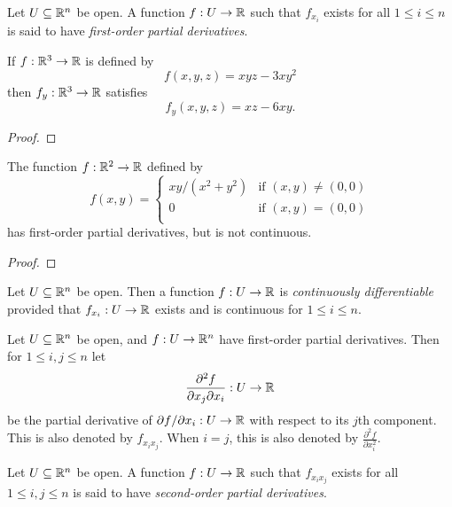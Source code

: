 \documentclass[letterpaper, twoside, 12pt]{book}
\begin{document}
\begin{definition}
  Let \(U\subseteq\mathbb R^n\) be open. A function
  \(f:U\to\mathbb R\) such that \(f_{x_i}\) exists for all \(1\leq i\leq n\) is said
  to have \textit{first-order partial derivatives}.
\end{definition}

\begin{example}[13.8*]
  If \(f:\mathbb R^3\to\mathbb R\) is defined by
  \[
    f(x,y,z)=xyz-3xy^2
  \]
  then \(f_y:\mathbb R^3\to\mathbb R\) satisfies
  \[
    f_y(x,y,z)=xz-6xy
  .\]
\end{example}
\begin{proof}

\end{proof}

\begin{example}[13.9]
  The function \(f:\mathbb R^2\to\mathbb R\) defined by
  \[
    f(x,y) = \begin{cases}
      xy/(x^2+y^2) & \text{if } (x,y)\not=(0,0) \\
      0 & \text{if } (x,y)=(0,0) \\
    \end{cases}
  \]
  has first-order partial derivatives, but is not continuous.
\end{example}
\begin{proof}

\end{proof}

\begin{definition}
  Let \(U\subseteq\mathbb R^n\) be open. Then a function
  \(f:U\to\mathbb R\) is \textit{continuously differentiable} provided that
  \(f_{x_i}:U\to\mathbb R\) exists and is continuous for \(1\leq i\leq n\).
\end{definition}

\begin{definition}
  Let \(U\subseteq\mathbb R^n\) be open, and \(f:U\to\mathbb R^n\) have first-order
  partial derivatives. Then for \(1\leq i,j\leq n\) let
  \[
    \frac{\partial^2 f}{\partial x_j\partial x_i}
      :
    U \to \mathbb R
  \]
  be the partial derivative of \(\partial f/\partial x_i:U\to\mathbb R\)
  with respect to its \(j\)th component. This is also denoted by
  \(f_{x_ix_j}\). When \(i=j\), this is also denoted by
  \(\frac{\partial^2 f}{\partial x_i^2}\).
\end{definition}

\begin{definition}
  Let \(U\subseteq\mathbb R^n\) be open. A function
  \(f:U\to\mathbb R\) such that \(f_{x_ix_j}\) exists for all
  \(1\leq i,j\leq n\) is said
  to have \textit{second-order partial derivatives}.
\end{definition}
\end{document}
